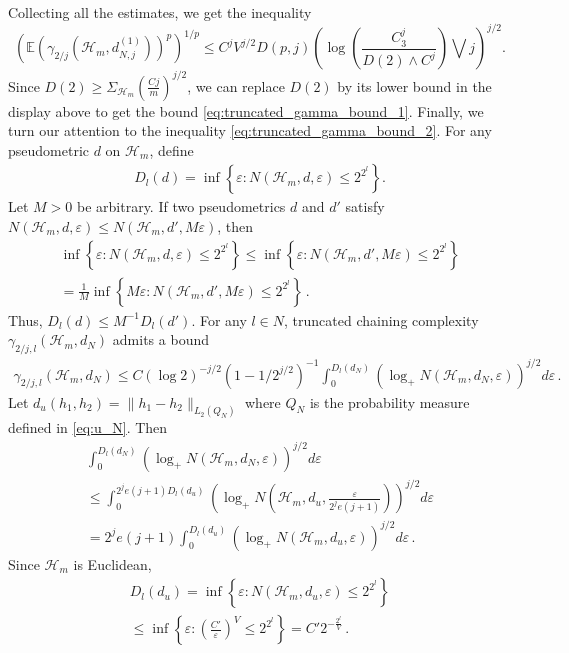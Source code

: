 \documentclass[12pt]{article}
\def\l{\left}
\def\r{\right}
\newcommand{\m}{\mathcal}
\newcommand{\mb}{\mathbb}
\theoremstyle{thmstyletwo}%
\theoremstyle{thmstylethree}%
\begin{document}
Collecting all the estimates, we get the inequality
\begin{equation*}
    \l(\mb E \l(\gamma_{2/j} (\mathcal{H}_m, d^{(1)}_{N,j}) \r)^p\r)^{1/p} 
    \leq C^{j} V^{j/2} D(p,j) \l(\log\l(\frac{C_3^j}{D(2)\wedge C^j}\r)\bigvee j\r)^{j/2}.
\end{equation*}
Since $D(2)\geq \Sigma_{\m H_m}\l( \frac{Cj}{m}\r)^{j/2}$, we can replace $D(2)$ by its lower bound in the display above to get the bound \eqref{eq:truncated_gamma_bound_1}. 
Finally, we turn our attention to the inequality \eqref{eq:truncated_gamma_bound_2}. For any pseudometric $d$ on $\mathcal{H}_m$, define
\begin{align*}
    D_l(d) = \inf \l\{\varepsilon : N\l(\mathcal{H}_m, d, \varepsilon\r) \leq 2^{2^l}\r\}.
\end{align*}
Let $M > 0$ be arbitrary. If two pseudometrics $d$ and $d'$ satisfy $N\l(\mathcal{H}_m, d, \varepsilon\r) \leq N\l(\mathcal{H}_m, d', M\varepsilon\r)$, then
\begin{multline*}
    \inf \l\{\varepsilon : N\l(\mathcal{H}_m, d, \varepsilon\r) \leq 2^{2^l}\r\} \leq \inf \l\{\varepsilon : N\l(\mathcal{H}_m, d', M\varepsilon\r) \leq 2^{2^l}\r\} \\
    = \frac{1}{M}\inf \l\{M\varepsilon : N\l(\mathcal{H}_m, d', M\varepsilon\r) \leq 2^{2^l}\r\}\,.
\end{multline*}
Thus, $D_l(d) \leq M^{-1}D_l(d')$. For any $l\in N$, truncated chaining complexity $\gamma_{2/j, l} (\mathcal{H}_m, d_N)$ admits a bound
\begin{align*}
    \gamma_{2/j, l} (\mathcal{H}_m, d_N)\leq C(\log 2)^{-j/2}(1- 1/2^{j/2})^{-1} \int_0^{D_{l}(d_N)} \l(\log_+ N(\mathcal{H}_m, d_N, \varepsilon) \r)^{j/2} d\varepsilon\,.
\end{align*}
Let $d_u(h_1,h_2)=\|h_1-h_2\|_{L_2(Q_N)}$ where $Q_N$ is the probability measure defined in \eqref{eq:u_N}. Then
\begin{multline*}
    \int_0^{D_l(d_N)} \l(\log_+ N(\mathcal{H}_m, d_N, \varepsilon) \r)^{j/2} d\varepsilon \\
    \leq \int_0^{2^je(j+1)D_l(d_u)} \l(\log_+ N\l(\mathcal{H}_m, d_u, \frac{\varepsilon}{2^{j}e(j+1)}\r)\r)^{j/2} d\varepsilon \\
    = 2^{j}e(j+1) \int_0^{D_l(d_u)} \l(\log_+ N\l(\mathcal{H}_m, d_u, \varepsilon \r)\r)^{j/2} d\varepsilon\,.
\end{multline*}
Since $\m H_m$ is Euclidean, 
\begin{multline*}
    D_l(d_u) = \inf\l\{\varepsilon : N\l(\mathcal{H}_m, d_u, \varepsilon\r) \leq 2^{2^l}\r\} \\
    \leq \inf\l\{\varepsilon : \l(\frac{C'}{\varepsilon}\r)^{V} \leq 2^{2^l}\r\} = C' 2^{-\frac{2^l}{V}}\,.
\end{multline*}
\end{document}
